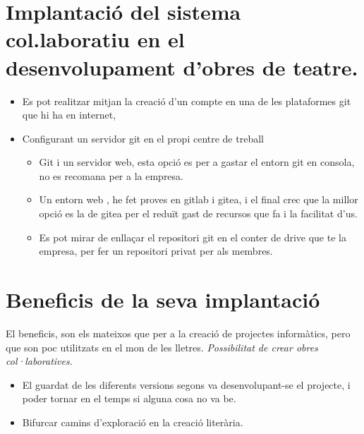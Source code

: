 \documentclass[
  10pt, krantz2,
]{krantz}
\providecommand{\tightlist}{%
  \setlength{\itemsep}{0pt}\setlength{\parskip}{0pt}}
\begin{document}
\hypertarget{implantaciuxf3-del-sistema-col.laboratiu-en-el-desenvolupament-dobres-de-teatre.}{%
\section{Implantació del sistema col.laboratiu en el desenvolupament d'obres de teatre.}\label{implantaciuxf3-del-sistema-col.laboratiu-en-el-desenvolupament-dobres-de-teatre.}}

\begin{itemize}
\tightlist
\item
  Es pot realitzar mitjan la creació d'un compte en una de les plataformes git que hi ha en internet,
\item
  Configurant un servidor git en el propi centre de treball

  \begin{itemize}
  \tightlist
  \item
    Git i un servidor web, esta opció es per a gastar el entorn git en consola, no es recomana per a la empresa.
  \item
    Un entorn web , he fet proves en gitlab i gitea, i el final crec que la millor opció es la de gitea per el reduït gast de recursos que fa i la facilitat d'us.
  \item
    Es pot mirar de enllaçar el repositori git en el conter de drive que te la empresa, per fer un repositori privat per als membres.
  \end{itemize}
\end{itemize}

\hypertarget{beneficis-de-la-seva-implantaciuxf3}{%
\section{Beneficis de la seva implantació}\label{beneficis-de-la-seva-implantaciuxf3}}

El beneficis, son els mateixos que per a la creació de projectes informàtics, pero que son poc utilitzats en el mon de les lletres. \emph{Possibilitat de crear obres col·laboratives.}

\begin{itemize}
\tightlist
\item
  El guardat de les diferents versions segons va desenvolupant-se el projecte, i poder tornar en el temps si alguna cosa no va be.
\item
  Bifurcar camins d'exploració en la creació literària.
\end{itemize}
\end{document}

